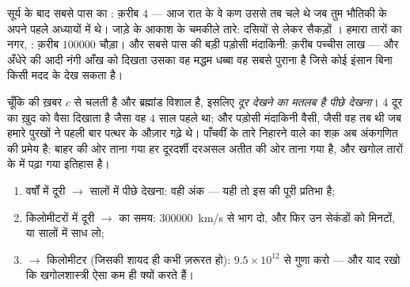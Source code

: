 \begin{example}[प्रकाश वर्षों में हमारा पड़ोस]\label{ex:g8:speed-of-light:ladder}
सूर्य के बाद सबसे पास का : क़रीब $4$  --- आज रात के वे
कण उससे तब चले थे जब तुम भौतिकी के अपने पहले अध्यायों में थे। जाड़े के
आकाश के चमकीले तारे: दसियों से लेकर सैकड़ों । हमारा तारों
का नगर, : क़रीब $100000$  चौड़ा। और सबसे पास की
बड़ी पड़ोसी मंदाकिनी: क़रीब पच्चीस लाख  --- और अँधेरे की
आदी नंगी आँख को दिखता उसका वह मद्धम
धब्बा वह सबसे पुराना  है जिसे कोई इंसान बिना किसी मदद के देख
सकता है।
\end{example}

\begin{proposition}[दूरबीनें समय-मशीनें हैं]\label{prop:g8:speed-of-light:timemachine}
चूँकि  की ख़बर $c$ से चलती है और ब्रह्मांड विशाल है, इसलिए
\emph{दूर देखने का मतलब है पीछे देखना}। $4$  दूर का 
ख़ुद को वैसा दिखाता है जैसा वह $4$ साल पहले था; और पड़ोसी मंदाकिनी
वैसी, जैसी वह तब थी जब हमारे पुरखों ने पहली बार पत्थर के औज़ार गढ़े थे।
पाँचवीं  के तारे निहारने वाले का शक़ अब अंकगणित की प्रमेय है: बाहर
की ओर ताना गया हर दूरदर्शी दरअसल अतीत की ओर ताना गया है, और खगोल तारों
के  में पढ़ा गया इतिहास है।
\end{proposition}

\begin{method}[दूरी और पीछे देखने का बदलाव]\label{met:g8:speed-of-light:convert}
\begin{enumerate}
  \item {} वर्षों में दूरी $\to$ सालों में पीछे देखना: वही अंक
        --- यही तो इस  की पूरी प्रतिभा है;
  \item किलोमीटरों में दूरी $\to$  का समय: \qty{300000}{km/s}
        से भाग दो, और फिर उन सेकंडों को मिनटों,  या सालों में
        साध लो;
  \item {} $\to$ किलोमीटर (जिसकी शायद ही कभी ज़रूरत हो):
        $9.5 \times 10^{12}$ से गुणा करो --- और याद रखो कि
        खगोलशास्त्री ऐसा कम ही क्यों करते हैं।
\end{enumerate}
\end{method}

